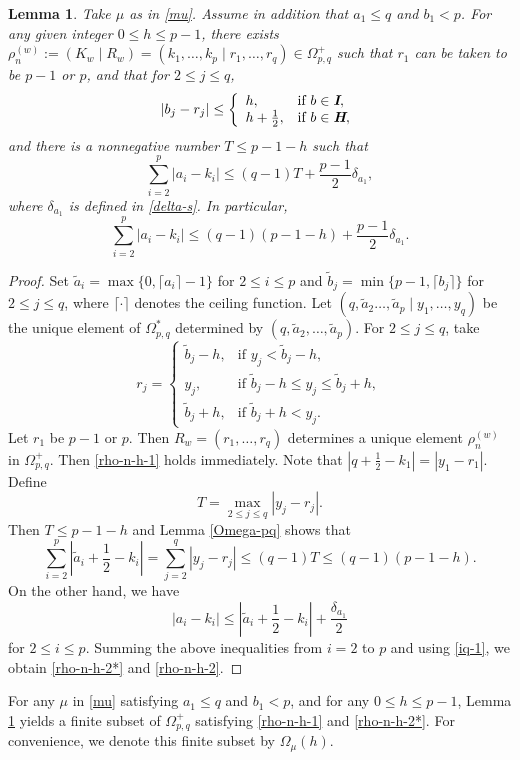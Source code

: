 \documentclass[11pt]{amsart}
\theoremstyle{plain}
\newtheorem{lemma}[thm]{Lemma}
\theoremstyle{definition}
\begin{document}
\begin{lemma}\label{rho-n-h}
	Take $\mu$ as in \eqref{mu}. Assume in addition that $a_1\le q$ and $b_1< p$. For any given integer $0\le h\le p-1$, there exists $\rho_n^{(w)}:=(K_w\mid R_w)=(k_1,\dots,k_p\mid r_1,\dots,r_q)\in \Omega_{p,q}^+$ such that $r_1$ can be taken to be $p-1$ or $p$, and that for $2\le j \le q$,
	\begin{equation}\label{rho-n-h-1}
		|b_j-r_j|\le\left\{
		\begin{array}{ll}
			h, & \mbox{if $b\in \emph{\textbf{I}}$},\\
			h+\frac{1}{2}, & \mbox{if $b\in \emph{\textbf{H}}$},
		\end{array}
		\right.
	\end{equation}
	and there is a nonnegative number $T\le p-1-h$ such that
	\begin{equation}\label{rho-n-h-2*}
		\sum_{i=2}^p |a_i-k_i|\le (q-1)T+\frac{p-1}{2}\delta_{a_1},
	\end{equation}
	where $\delta_{a_1}$ is defined in \eqref{delta-s}. In particular,
	\begin{equation}\label{rho-n-h-2}
		\sum_{i=2}^p |a_i-k_i|\le (q-1)(p-1-h)+\frac{p-1}{2}\delta_{a_1}.
	\end{equation}
\end{lemma}
\begin{proof}
	Set $\widetilde{a}_i=\max\{0,\lceil a_i\rceil-1\}$ for $2\le i\le p$ and $\widetilde{b}_j=\min\{p-1,\lceil b_j\rceil\}$ for $2\le j\le q$, where $\lceil\cdot\rceil$ denotes the ceiling function. Let $(q,\widetilde{a}_2\dots,\widetilde{a}_p\mid y_1,\dots,y_q)$ be the unique element of $\Omega_{p,q}^*$ determined by $(q,\widetilde{a}_2,\dots,\widetilde{a}_p)$. For $2\le j\le q$, take
	\[r_j=\left\{
	\begin{array}{ll}
		\widetilde{b}_j-h, & \mbox{if $y_j<\widetilde{b}_j-h$},\\
		y_j, & \mbox{if $\widetilde{b}_j-h\le y_j\le\widetilde{b}_j+h$},\\
		\widetilde{b}_j+h, & \mbox{if $\widetilde{b}_j+h< y_j$}.
	\end{array}
	\right.\]
	Let $r_1$ be $p-1$ or $p$. Then $R_w=(r_1,\dots,r_q)$  determines a unique element $\rho_n^{(w)}$ in $\Omega_{p,q}^+$. Then \eqref{rho-n-h-1} holds immediately. Note that $|q+\frac{1}{2}-k_1|=|y_1-r_1|$. Define
	\[T=\max_{2\le j\le q}|y_j-r_j|.\]
	Then $T\le p-1
	-h$ and Lemma \ref{Omega-pq} shows that
	\begin{equation}\label{iq-1}
		\sum_{i=2}^p |\widetilde{a}_i+\frac{1}{2}-k_i|=\sum_{j=2}^q|y_j-r_j|\le (q-1)T\le (q-1)(p-1-h).
	\end{equation}
	On the other hand, we have
	\[|a_i-k_i|\le |\widetilde{a}_i+\frac{1}{2}-k_i|+\frac{\delta_{a_1}}{2}\]
	for $2\le i\le p$. Summing the above inequalities from $i=2$ to $p$ and using \eqref{iq-1}, we obtain \eqref{rho-n-h-2*} and \eqref{rho-n-h-2}.
\end{proof}
For any $\mu$ in \eqref{mu} satisfying $a_1\le q$ and $b_1<p$, and for any $0\le h\le p-1$, Lemma \ref{rho-n-h} yields a finite subset of $\Omega_{p,q}^+$ satisfying \eqref{rho-n-h-1} and \eqref{rho-n-h-2*}. For convenience, we denote this finite subset by $\Omega_{\mu}(h)$.
\end{document}
